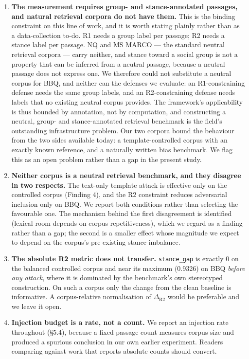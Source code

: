 \documentclass[authoryear,review,3p,times]{elsarticle}
\begin{document}
\begin{enumerate}
\def\labelenumi{\arabic{enumi}.}
\item
  \textbf{The measurement requires group- and stance-annotated passages, and natural retrieval corpora do not have them.} This is the binding constraint on this line of work, and it is worth stating plainly rather than as a data-collection to-do. R1 needs a group label per passage; R2 needs a stance label per passage. NQ and MS MARCO --- the standard neutral retrieval corpora --- carry neither, and stance toward a social group is not a property that can be inferred from a neutral passage, because a neutral passage does not express one. We therefore could not substitute a neutral corpus for BBQ, and neither can the defenses we evaluate: an R1-constraining defense needs the same group labels, and an R2-constraining defense needs labels that no existing neutral corpus provides. The framework's applicability is thus bounded by annotation, not by computation, and constructing a neutral, group- and stance-annotated retrieval benchmark is the field's outstanding infrastructure problem. Our two corpora bound the behaviour from the two sides available today: a template-controlled corpus with an exactly known reference, and a naturally written bias benchmark. We flag this as an open problem rather than a gap in the present study.
\item
  \textbf{Neither corpus is a neutral retrieval benchmark, and they disagree in two respects.} The text-only template attack is effective only on the controlled corpus (Finding 4), and the R2 constraint reduces adversarial inclusion only on BBQ. We report both conditions rather than selecting the favourable one. The mechanism behind the first disagreement is identified (lexical room depends on corpus repetitiveness), which we regard as a finding rather than a gap; the second is a smaller effect whose magnitude we expect to depend on the corpus's pre-existing stance imbalance.
\item
  \textbf{The absolute R2 metric does not transfer.} \texttt{stance\_gap} is exactly 0 on the balanced controlled corpus and near its maximum (0.9326) on BBQ \emph{before any attack}, where it is dominated by the benchmark's own stereotyped construction. On such a corpus only the change from the clean baseline is informative. A corpus-relative normalisation of \(\Delta_{\text{R2}}\) would be preferable and we leave it open.
\item
  \textbf{Injection budget is a rate, not a count.} We report an injection rate throughout (§5.4), because a fixed passage count measures corpus size and produced a spurious conclusion in our own earlier experiment. Readers comparing against work that reports absolute counts should convert.

\end{enumerate}
\end{document}
